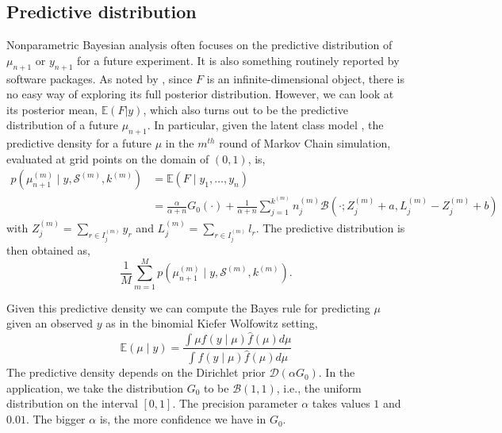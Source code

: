 \documentclass[12pt]{amsart}
\begin{document}
{\subsection{Predictive distribution}
Nonparametric Bayesian analysis often focuses on the predictive distribution of $\mu_{n+1}$ or 
$y_{n+1}$ for a future experiment.  It is also something routinely reported by software packages.
As noted by , since $F$ is an infinite-dimensional object, there is no 
easy way of exploring its full posterior distribution. However, we can look at its 
posterior mean, $\mathbb{E}(F | y )$, which also turns out to be the predictive distribution 
of a future $\mu_{n+1}$. In particular, given the latent class model , the predictive density 
for a future $\mu$ in the $m^{th}$ round of Markov Chain simulation, evaluated at grid points 
on the domain of $(0,1)$, is,
\[
\begin{array}{ll}
p(\mu_{n+1}^{(m)} \mid y, \mathcal{S}^{(m)}, k^{(m)}) &= \mathbb{E}(F \mid y_{1}, \dots, y_{n}) \\
&= \frac{\alpha}{\alpha+n} G_{0}(\cdot)+ \frac{1}{\alpha +n} \sum_{j=1}^{k^{(m)}} n_{j}^{(m)} \mathcal{B}(\cdot; Z_{j}^{(m)} +a, L_{j}^{(m)}-Z_{j}^{(m)}+b)
\end{array}
\]
with $Z_{j}^{(m)}=\sum_{r \in I_{j}^{(m)}}y_{r}$ and 
$L_{j}^{(m)}=\sum_{r \in I_{j}^{(m)}}l_{r}$. 
The predictive distribution is then obtained  as,
\[
\frac{1}{M}\sum_{m=1}^{M} p(\mu_{n+1}^{(m)} \mid y, \mathcal{S}^{(m)}, k^{(m)}).
\]



Given this predictive density we can compute the Bayes rule for predicting $\mu$ given an
observed $y$ as in the binomial Kiefer Wolfowitz setting,
\[
\mathbb{E}(\mu \mid y) =\frac{\int \mu f(y \mid \mu) \hat f(\mu) d\mu}{\int f(y \mid \mu) \hat f(\mu) d\mu}
\]
The predictive density depends on the Dirichlet prior $\mathcal{D}(\alpha G_{0})$. 
In the application, we take the distribution $G_{0}$ to be $\mathcal{B}(1,1)$, 
i.e., the uniform distribution on the interval $[0,1]$. The precision parameter 
$\alpha$ takes values $1$ and $0.01$. 
The bigger $\alpha$ is, the more confidence we have in $G_{0}$. 
}
\end{document}

